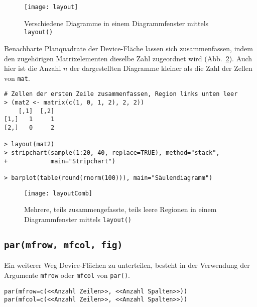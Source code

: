 \begin{figure}[ht]
\centering
\texttt{[image: layout]}
\vspace*{-1em}
\caption{Verschiedene Diagramme in einem Diagrammfenster mittels \lstinline!layout()!}
\label{fig:layout}
\end{figure}

Benachbarte Planquadrate der Device-Fläche lassen sich zusammenfassen, indem den zugehörigen Matrixelementen dieselbe Zahl zugeordnet wird (Abb.\ \ref{fig:layoutComb}). Auch hier ist die Anzahl $n$ der dargestellten Diagramme kleiner als die Zahl der Zellen von \lstinline!mat!.
\begin{lstlisting}
# Zellen der ersten Zeile zusammenfassen, Region links unten leer
> (mat2 <- matrix(c(1, 0, 1, 2), 2, 2))
    [,1]  [,2]
[1,]   1     1
[2,]   0     2

> layout(mat2)
> stripchart(sample(1:20, 40, replace=TRUE), method="stack",
+            main="Stripchart")

> barplot(table(round(rnorm(100))), main="Säulendiagramm")
\end{lstlisting}

\begin{figure}[ht]
\centering
\texttt{[image: layoutComb]}
\vspace*{-1em}
\caption{Mehrere, teils zusammengefasste, teils leere Regionen in einem Diagrammfenster mittels \lstinline!layout()!}
\label{fig:layoutComb}
\end{figure}

\subsection{\texttt{par(mfrow, mfcol, fig)}}
\label{sec:parMfRow}

Ein weiterer Weg Device-Flächen zu unterteilen, besteht in der Verwendung der Argumente \lstinline!mfrow! oder \lstinline!mfcol! von \lstinline!par()!.
\begin{lstlisting}
par(mfrow=c(<<Anzahl Zeilen>>, <<Anzahl Spalten>>))
par(mfcol=c(<<Anzahl Zeilen>>, <<Anzahl Spalten>>))
\end{lstlisting}

